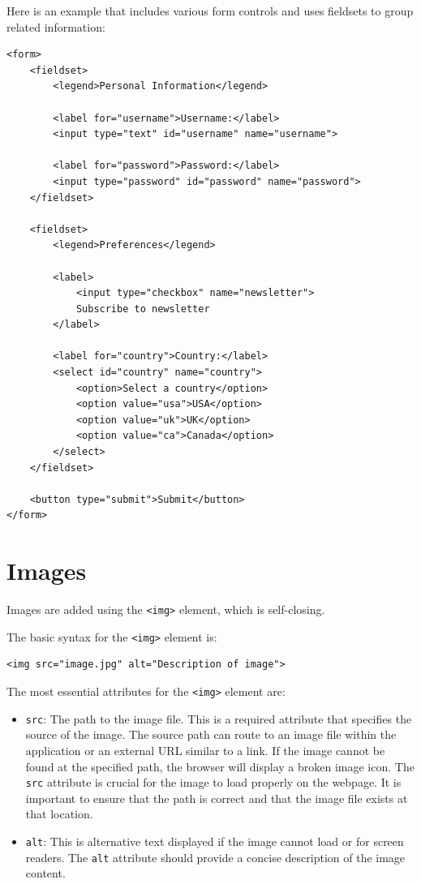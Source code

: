 Here is an example that includes various form controls and uses fieldsets to group related information:

\begin{verbatim}
<form>
    <fieldset>
        <legend>Personal Information</legend>

        <label for="username">Username:</label>
        <input type="text" id="username" name="username">

        <label for="password">Password:</label>
        <input type="password" id="password" name="password">
    </fieldset>

    <fieldset>
        <legend>Preferences</legend>

        <label>
            <input type="checkbox" name="newsletter">
            Subscribe to newsletter
        </label>

        <label for="country">Country:</label>
        <select id="country" name="country">
            <option>Select a country</option>
            <option value="usa">USA</option>
            <option value="uk">UK</option>
            <option value="ca">Canada</option>
        </select>
    </fieldset>

    <button type="submit">Submit</button>
</form>
\end{verbatim}

\section{Images}
Images are added using the \verb|<img>| element, which is self-closing.

The basic syntax for the \verb|<img>| element is:

\begin{verbatim}
<img src="image.jpg" alt="Description of image">
\end{verbatim}

The most essential attributes for the \verb|<img>| element are:

\begin{itemize}
    \item \verb|src|: The path to the image file. This is a required attribute that specifies the source of the image.
     The source path can route to an image file within the application or an external URL similar to a link.
     If the image cannot be found at the specified path, the browser will display a broken image icon.
     The \verb|src| attribute is crucial for the image to load properly on the webpage.
     It is important to ensure that the path is correct and that the image file exists at that location.
    \item \verb|alt|: This is alternative text displayed if the image cannot load or for
      screen readers. The \verb|alt| attribute should provide a concise description of the image content.
\end{itemize}


